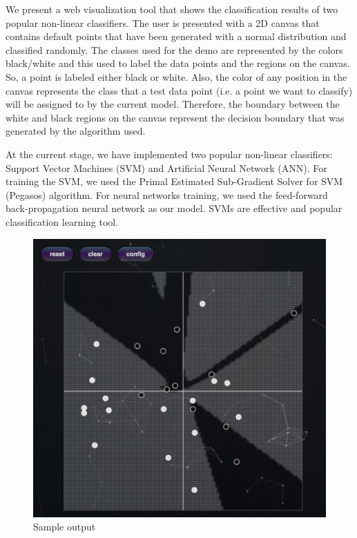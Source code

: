 \documentclass[11pt,letterpaper]{article}
\begin{document}
We present a web visualization tool that shows the classification results of two popular non-linear classifiers. The user is presented with a 2D canvas that contains default points that have been generated with a normal distribution and classified randomly. The classes used for the demo are represented by the colors black/white and this used to label the data points and the regions on the canvas. So, a point is labeled either black or white. Also, the color of any position in the canvas represents the class that a test data point (i.e. a point we want to classify) will be assigned to by the current model. Therefore, the boundary between the white and black regions on the canvas represent the decision boundary that was generated by the algorithm used. 

At the current stage, we have implemented two popular non-linear classifiers: Support Vector Machines (SVM) and Artificial Neural Network (ANN). For training the SVM, we used the Primal Estimated Sub-Gradient Solver for SVM (Pegasos) algorithm. For neural networks training, we used the feed-forward back-propagation neural network as our model. 
SVMs are effective and popular classification learning tool. 

\begin{figure}
\centering
\includegraphics[scale=.5]{images/Intro.PNG}
\caption{Sample output}
\label{fig:intro}
\end{figure}
\end{document}

